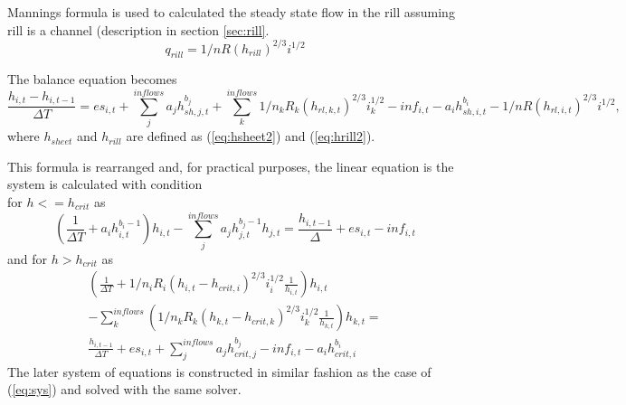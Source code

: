         Mannings formula is used to calculated the steady state flow in
        the rill assuming rill is a channel (description in section \ref{sec:rill}.  
        $$
        q_{rill} = 1/n R(h_{rill})^{2/3} i^{1/2}
        $$


        The balance equation becomes
        \begin{dmath}
          \frac{h_{i,t} - h_{i,t-1} }{\Delta T} = 
          es_{i,t} + \sum_j^{inflows} a_jh^{b_{j}}_{sh,j,t}  + \sum_k^{inflows} 1/n_k R_k(h_{rl,k,t})^{2/3} i_k^{1/2} - inf_{i,t} - a_ih^{b_{i}}_{sh,i,t} - 1/n R(h_{rl,i,t})^{2/3} i^{1/2},
        \end{dmath}
        where $h_{sheet}$ and $h_{rill}$ are defined as (\ref{eq:hsheet2}) and  (\ref{eq:hrill2}).

        This formula is rearranged and, for practical purposes, the linear equation is the system is calculated with condition \\
        for  $h<=h_{crit}$ as
        \begin{equation}
            \left(\frac{1}{\Delta T}+a_ih^{b_{i}-1}_{i,t}\right)h_{i,t} -  \sum_j^{inflows} a_jh^{b_{j}-1}_{j,t} h_{j,t} = \frac{h_{i,t-1}}{\Delta} +  es_{i,t} - inf_{i,t}
        \end{equation}
        and for  $h>h_{crit}$ as
        \begin{multline}
          \left(\frac{1}{\Delta T}
          + 1/n_i R_i(h_{i,t}-h_{crit,i})^{2/3} i_i^{1/2} \frac{1}{h_{i,t}}\right)h_{i,t} \\
            - \sum_k^{inflows} \left( 1/n_k R_k(h_{k,t}-h_{crit,k})^{2/3} i_k^{1/2}  \frac{1}{h_{k,t}}\right)h_{k,t}
          =  \\
          \frac{h_{i,t-1} }{\Delta T}
          + es_{i,t} 
          + \sum_j^{inflows} a_j h^{b_{j}}_{crit,j}  
          - inf_{i,t} 
          - a_i h^{b_{i}}_{crit,i} 
        \end{multline}
    The later system of equations is constructed in similar fashion as the case of (\ref{eq:sys}) and solved with the same solver.

